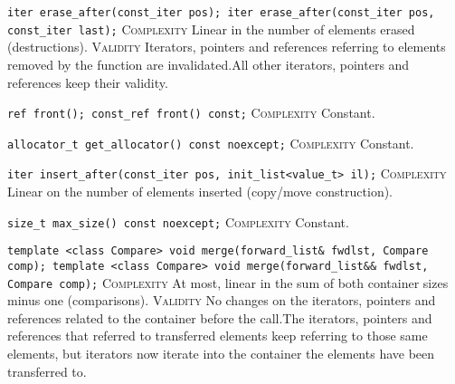 \noindent{}\hspace*{0.25em}\lstinline[basicstyle=\ttfamily\color{corange}]{iter erase_after(const_iter pos); iter erase_after(const_iter pos, const_iter last);} \textsc{Complexity} Linear in the number of elements erased (destructions). \textsc{Validity} Iterators, pointers and references referring to elements removed by the function are invalidated.All other iterators, pointers and references keep their validity.\\\vspace{-0.6em}

\noindent{}\hspace*{0.25em}\lstinline[basicstyle=\ttfamily\color{cgreen}]{ref front(); const_ref front() const;} \textsc{Complexity} Constant.\\\vspace{-0.6em}

\noindent{}\hspace*{0.25em}\lstinline[basicstyle=\ttfamily\color{cgreen}]{allocator_t get_allocator() const noexcept;} \textsc{Complexity} Constant.\\\vspace{-0.6em}

\noindent{}\hspace*{0.25em}\lstinline[basicstyle=\ttfamily\color{corange}]{iter insert_after(const_iter pos, init_list<value_t> il);} \textsc{Complexity} Linear on the number of elements inserted (copy/move construction).\\\vspace{-0.6em}

\noindent{}\hspace*{0.25em}\lstinline[basicstyle=\ttfamily\color{cgreen}]{size_t max_size() const noexcept;} \textsc{Complexity} Constant.\\\vspace{-0.6em}

\noindent{}\hspace*{0.25em}\lstinline[basicstyle=\ttfamily\color{corange}]{template <class Compare> void merge(forward_list& fwdlst, Compare comp); template <class Compare> void merge(forward_list&& fwdlst, Compare comp);} \textsc{Complexity} At most, linear in the sum of both container sizes minus one (comparisons). \textsc{Validity} No changes on the iterators, pointers and references related to the container before the call.The iterators, pointers and references that referred to transferred elements keep referring to those same elements, but iterators now iterate into the container the elements have been transferred to.\\\vspace{-0.6em}

